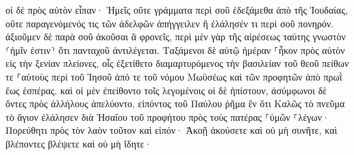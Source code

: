\documentclass{openreader}
\begin{document}
οἱ δὲ πρὸς αὐτὸν εἶπαν· Ἡμεῖς οὔτε γράμματα περὶ σοῦ ἐδεξάμεθα ἀπὸ τῆς Ἰουδαίας, οὔτε παραγενόμενός τις τῶν ἀδελφῶν ἀπήγγειλεν ἢ ἐλάλησέν τι περὶ σοῦ πονηρόν. 
ἀξιοῦμεν δὲ παρὰ σοῦ ἀκοῦσαι ἃ φρονεῖς, περὶ μὲν γὰρ τῆς αἱρέσεως ταύτης γνωστὸν ⸂ἡμῖν ἐστιν⸃ ὅτι πανταχοῦ ἀντιλέγεται. 
Ταξάμενοι δὲ αὐτῷ ἡμέραν ⸀ἧκον πρὸς αὐτὸν εἰς τὴν ξενίαν πλείονες, οἷς ἐξετίθετο διαμαρτυρόμενος τὴν βασιλείαν τοῦ θεοῦ πείθων τε ⸀αὐτοὺς περὶ τοῦ Ἰησοῦ ἀπό τε τοῦ νόμου Μωϋσέως καὶ τῶν προφητῶν ἀπὸ πρωῒ ἕως ἑσπέρας. 
καὶ οἱ μὲν ἐπείθοντο τοῖς λεγομένοις οἱ δὲ ἠπίστουν, 
ἀσύμφωνοι δὲ ὄντες πρὸς ἀλλήλους ἀπελύοντο, εἰπόντος τοῦ Παύλου ῥῆμα ἓν ὅτι Καλῶς τὸ πνεῦμα τὸ ἅγιον ἐλάλησεν διὰ Ἠσαΐου τοῦ προφήτου πρὸς τοὺς πατέρας ⸀ὑμῶν 
⸀λέγων· Πορεύθητι πρὸς τὸν λαὸν τοῦτον καὶ εἰπόν· Ἀκοῇ ἀκούσετε καὶ οὐ μὴ συνῆτε, καὶ βλέποντες βλέψετε καὶ οὐ μὴ ἴδητε· 
\end{document}
